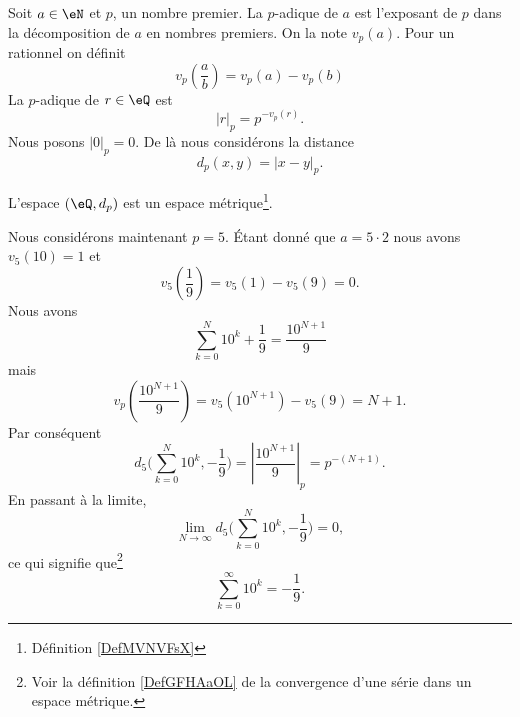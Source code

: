 Soit \( a\in \eN\) et \( p\), un nombre premier. La  \( p\)-adique de \( a\) est l'exposant de \( p\) dans la décomposition de \( a\) en nombres premiers. On la note \( v_p(a)\). Pour un rationnel on définit
\begin{equation}
    v_p\left( \frac{ a }{ b } \right)=v_p(a)-v_p(b)
\end{equation}
La  \( p\)-adique de \( r\in \eQ\) est 
\begin{equation}
    | r |_p=p^{-v_p(r)}.
\end{equation}
Nous posons \( | 0 |_p=0\). De là nous considérons la distance
\begin{equation}
    d_p(x,y)=| x-y |_p.
\end{equation}

\begin{lemma}
    L'espace \( (\eQ,d_p)\) est un espace métrique\footnote{Définition \ref{DefMVNVFsX}}.
\end{lemma}

Nous considérons maintenant \( p=5\). Étant donné que \( a=5\cdot 2\) nous avons \( v_5(10)=1\) et
\begin{equation}
    v_5\left( \frac{1}{ 9 } \right)=v_5(1)-v_5(9)=0.
\end{equation}
Nous avons
\begin{equation}
    \sum_{k=0}^N10^k+\frac{1}{ 9 }=\frac{ 10^{N+1} }{ 9 }
\end{equation}
mais
\begin{equation}
    v_p\left( \frac{ 10^{N+1} }{ 9 } \right)=v_5(10^{N+1})-v_5(9)=N+1.
\end{equation}
Par conséquent
\begin{equation}
    d_5\big( \sum_{k=0}^N10^k,-\frac{1}{ 9 } \big)=| \frac{ 10^{N+1} }{ 9 } |_p=p^{-(N+1)}.
\end{equation}
En passant à la limite,
\begin{equation}
    \lim_{N\to \infty} d_5\big( \sum_{k=0}^N10^k,-\frac{1}{ 9 } \big)=0,
\end{equation}
ce qui signifie que\footnote{Voir la définition \ref{DefGFHAaOL} de la convergence d'une série dans un espace métrique.}
\begin{equation}
    \sum_{k=0}^{\infty}10^k=-\frac{1}{ 9 }.
\end{equation}
